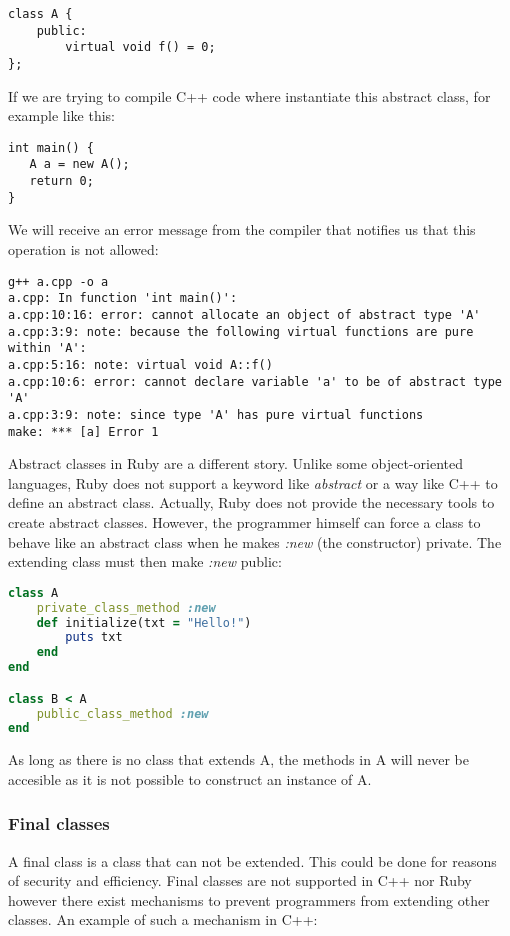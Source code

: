 \documentclass[10pt,a4paper,twocolumn]{article}
\begin{document}
\begin{lstlisting}
class A {
	public:
		virtual void f() = 0;
};
\end{lstlisting}

If we are trying to compile C++ code where instantiate this abstract class, for example like this:

\begin{lstlisting}
int main() {
   A a = new A();
   return 0;
}
\end{lstlisting}

We will receive an error message from the compiler that notifies us that this operation is not allowed:

\begin{lstlisting}
g++ a.cpp -o a
a.cpp: In function 'int main()':
a.cpp:10:16: error: cannot allocate an object of abstract type 'A'
a.cpp:3:9: note: because the following virtual functions are pure within 'A':
a.cpp:5:16: note: virtual void A::f()
a.cpp:10:6: error: cannot declare variable 'a' to be of abstract type 'A'
a.cpp:3:9: note: since type 'A' has pure virtual functions
make: *** [a] Error 1
\end{lstlisting}

Abstract classes in Ruby are a different story. Unlike some object-oriented languages, Ruby does not support a keyword like \textit{abstract} or a way like C++ to define an abstract class. Actually, Ruby does not provide the necessary tools to create abstract classes. However, the programmer himself can force a class to behave like an abstract class when he makes \textit{:new} (the constructor) private. The extending class must then make \textit{:new} public:

\begin{lstlisting}[language=Ruby]
class A
	private_class_method :new
	def initialize(txt = "Hello!")
		puts txt
	end
end

class B < A
	public_class_method :new
end
\end{lstlisting}

As long as there is no class that extends A, the methods in A will never be accesible as it is not possible to construct an instance of A.

\subsubsection{Final classes}
A final class is a class that can not be extended. This could be done for reasons of security and efficiency. Final classes are not supported in C++ nor Ruby however there exist mechanisms to prevent programmers from extending other classes. An example of such a mechanism in C++:
\end{document}
